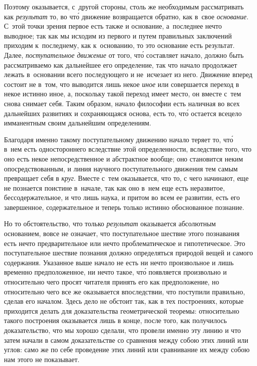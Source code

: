 Поэтому оказывается, с~другой стороны, столь же необходимым рассматривать как
{\em результат} то, во чт\'{о} движение возвращается обратно, как в~свое
{\em основание}. С~этой точки зрения первое есть также и основание, а~последнее
нечто выводное; так как мы исходим из первого и путем правильных заключений
приходим к~последнему, как к~основанию, то это основание есть результат. Далее,
{\em поступательное движение} от того, чт\'{о} составляет начало, должно быть
рассматриваемо как дальнейшее его определение, так что начало продолжает лежать
в~основании всего последующего и не~исчезает из него. Движение вперед состоит
не в~том, что выводится лишь некое {\em иное} или совершается переход в некое
истинно иное, а, поскольку такой переход имеет место, он вместе с~тем снова
снимает себя. Таким образом, начало философии есть наличная во всех дальнейших
развитиях и сохраняющаяся основа, есть то, чт\'{о} остается всецело имманентным
своим дальнейшим определениям.

Благодаря именно такому поступательному движению начало теряет то, чт\'{о}
в~нем есть одностороннего вследствие этой определенности, вследствие того, что
оно есть некое непосредственное и абстрактное вообще; оно становится неким
опосредствованным, и линия научного поступательного движения тем самым
превращает себя в {\em круг}. Вместе с~тем оказывается, что то, с чего
начинают, еще не познается поистине в~начале, так как оно в~нем еще есть
неразвитое, бессодержательное, и что лишь наука, и притом во всем ее развитии,
есть его завершенное, содержательное и теперь только истинно обоснованное
познание.

Но то обстоятельство, что только {\em результат} оказывается абсолютным
основанием, вовсе не означает, что поступательное шествие этого познавания есть
нечто предварительное или нечто проблематическое и гипотетическое. Это
поступательное шествие познания должно определяться природой вещей и самого
содержания. Указанное выше начало не есть ни нечто произвольное и лишь временно
предположенное, ни нечто такое, чт\'{о} появляется произвольно и относительно
чего просят читателя принять его как предположение, но относительно чего все же
оказывается впоследствии, что поступили правильно, сделав его началом. Здесь
дело не обстоит так, как в тех построениях, которые приходится делать для
доказательства геометрической теоремы: относительно такого построения
оказывается лишь в конце, после того, как получилось доказательство, что мы
хорошо сделали, что провели именно эту линию и что затем начали в самом
доказательстве со сравнения между собою этих линий или углов: само же по себе
проведение этих линий или сравнивание их между собою нам этого не показывает.

